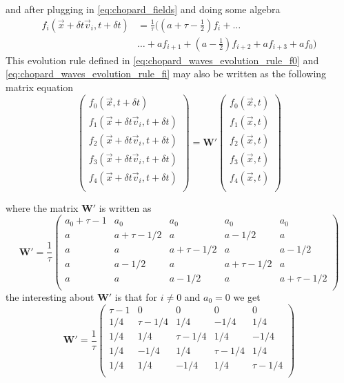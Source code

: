 and after plugging in \ref{eq:chopard_fields} and doing some algebra 
\begin{align}\label{eq:chopard_waves_evolution_rule_fi}
    f_i(\vec x+\delta t\vec v_i, t + \delta t) &= \frac{1}{\tau}\bigg(\left(a+\tau-\frac{1}{2}\right)f_i+\dots\nonumber\\
    &\dots+ a f_{i+1} + \left(a-\frac{1}{2}\right)f_{i+2} + a f_{i+3} + a f_0\bigg)
\end{align}
This evolution rule defined in \ref{eq:chopard_waves_evolution_rule_f0} and \ref{eq:chopard_waves_evolution_rule_fi} may also be written as the following matrix equation
\begin{equation}
    \begin{pmatrix}
        f_0(\vec x, t + \delta t) \\
        f_1(\vec x+\delta t\vec v_i, t + \delta t) \\
        f_2(\vec x+\delta t\vec v_i, t + \delta t) \\
        f_3(\vec x+\delta t\vec v_i, t + \delta t) \\
        f_4(\vec x+\delta t\vec v_i, t + \delta t) \\        
    \end{pmatrix}
    =
    \bm{W'}\begin{pmatrix}
        f_0(\vec x, t) \\
        f_1(\vec x, t) \\
        f_2(\vec x, t) \\
        f_3(\vec x, t) \\
        f_4(\vec x, t) \\        
    \end{pmatrix}
\end{equation}

where the matrix $\bm{W'}$ is written as
\begin{equation}
    \bm{W'} = \frac{1}{\tau}\begin{pmatrix}
        a_0 + \tau - 1 & a_0 & a_0 & a_0 & a_0 \\
        a & a + \tau - 1/2 & a & a - 1/2 & a \\
        a & a & a + \tau - 1/2 & a & a - 1/2 \\
        a & a - 1/2 & a & a + \tau - 1/2 & a \\
        a & a & a - 1/2 & a & a + \tau - 1/2 \\
    \end{pmatrix}
\end{equation}
the interesting about $\bm{W'}$ is that for $i\neq0$ and $a_0 = 0$ we get
\begin{equation}
    \bm{W'} = \frac{1}{\tau}\begin{pmatrix}
        \tau - 1 & 0 & 0 & 0 & 0 \\
        1/4 & \tau - 1/4 & 1/4 & -1/4 & 1/4 \\
        1/4 & 1/4 & \tau - 1/4 & 1/4 & -1/4 \\
        1/4 & -1/4 & 1/4 & \tau - 1/4 & 1/4 \\
        1/4 & 1/4 & -1/4 & 1/4 & \tau - 1/4 \\
    \end{pmatrix}
\end{equation}

